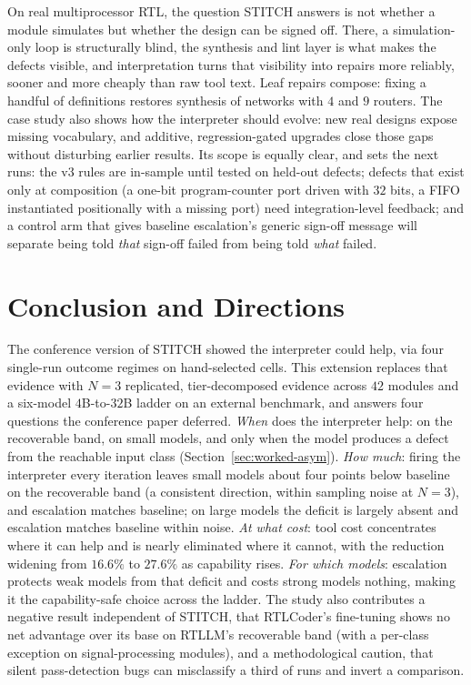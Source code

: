 \documentclass[11pt]{article}
\begin{document}
On real multiprocessor RTL, the question STITCH answers is not whether a module
simulates but whether the design can be signed off. There, a simulation-only
loop is structurally blind, the synthesis and lint layer is what makes the
defects visible, and interpretation turns that visibility into repairs more
reliably, sooner and more cheaply than raw tool text. Leaf repairs compose:
fixing a handful of definitions restores synthesis of networks with $4$ and
$9$ routers. The case study also shows how the interpreter should evolve: new
real designs expose missing vocabulary, and additive, regression-gated
upgrades close those gaps without disturbing earlier results. Its scope is
equally clear, and sets the next runs: the v3 rules are in-sample until tested
on held-out defects; defects that exist only at composition (a one-bit
program-counter port driven with $32$ bits, a FIFO instantiated positionally
with a missing port) need integration-level feedback; and a control arm that
gives baseline escalation's generic sign-off message will separate being told
\emph{that} sign-off failed from being told \emph{what} failed.

\section{Conclusion and Directions}
\label{sec:conclusion}

The conference version of STITCH showed the interpreter could help, via four
single-run outcome regimes on hand-selected cells. This extension replaces
that evidence with $N{=}3$ replicated, tier-decomposed evidence across $42$
modules and a six-model $4$B-to-$32$B ladder on an external benchmark, and
answers four questions the conference paper deferred. \emph{When} does the
interpreter help: on the recoverable band, on small models, and only when the
model produces a defect from the reachable input class
(Section~\ref{sec:worked-asym}). \emph{How much}: firing the interpreter every
iteration leaves small models about four points below baseline on the
recoverable band (a consistent direction, within sampling noise at $N{=}3$),
and escalation matches baseline; on large models the deficit is largely absent
and escalation matches baseline within noise. \emph{At what cost}: tool cost
concentrates where it can help and is nearly eliminated where it cannot, with
the reduction widening from $16.6\%$ to $27.6\%$ as capability rises.
\emph{For which models}: escalation protects weak models from that deficit and
costs strong models nothing, making it the capability-safe choice across the
ladder. The study also contributes a negative result independent of STITCH,
that RTLCoder's fine-tuning shows no net advantage over its base on RTLLM's
recoverable band (with a per-class exception on signal-processing modules), and
a methodological caution, that silent pass-detection bugs can misclassify a
third of runs and invert a comparison.
\end{document}
